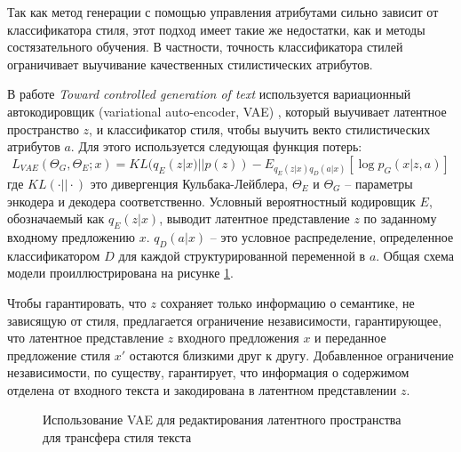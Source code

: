 Так как метод генерации с помощью управления атрибутами сильно зависит от классификатора стиля, этот подход имеет такие же недостатки, как и методы состязательного обучения.
В частности, точность классификатора стилей ограничивает выучивание качественных стилистических атрибутов.

В работе \textit{Toward controlled generation of text} \cite{hu2018controlled} используется вариационный автокодировщик (variational auto-encoder, VAE) \cite{kingma2022autoencoding}, который выучивает латентное пространство $z$, и классификатор стиля, чтобы выучить векто стилистических атрибутов $a$.
Для этого используется следующая функция потерь:
$$
L_{VAE}(\Theta_G, \Theta_E; x) = 
KL(q_E(z|x) || p(z))
- E_{q_E(z|x)q_D(a|x)} [\log p_G (x| z,a)]
$$
где $KL(\cdot||\cdot)$ это дивергенция Кульбака-Лейблера, $\Theta_E$ и $\Theta_G$ -- параметры энкодера и декодера соответственно.
Условный вероятностный кодировщик $E$, обозначаемый как $q_E(z|x)$, выводит латентное представление $z$ по заданному входному предложению $x$.
$q_D(a|x)$ -- это условное распределение, определенное классификатором $D$ для каждой структурированной переменной в $a$. 
Общая схема модели проиллюстрирована на рисунке \ref{fig:analysis_controled_text_generation}.

Чтобы гарантировать, что $z$ сохраняет только информацию о семантике, не зависящую от стиля, предлагается ограничение независимости, гарантирующее, что латентное представление $z$ входного предложения $x$ и переданное предложение стиля $x'$ остаются близкими друг к другу.
Добавленное ограничение независимости, по существу, гарантирует, что информация о содержимом отделена от входного текста и закодирована в латентном представлении $z$.

\begin{figure}[ht]
  \centering
  \caption{Использование VAE для редактирования латентного пространства для трансфера стиля текста}
  \label{fig:analysis_controled_text_generation}
\end{figure}

